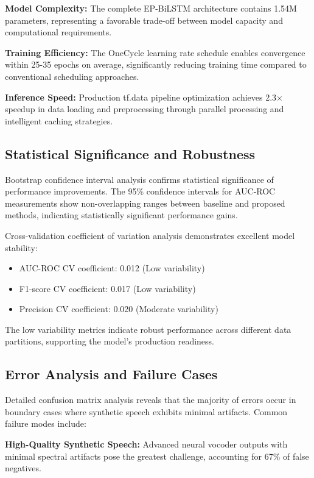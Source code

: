 \documentclass[conference]{IEEEtran}
\begin{document}
\textbf{Model Complexity:} The complete EP-BiLSTM architecture contains 1.54M parameters, representing a favorable trade-off between model capacity and computational requirements.

\textbf{Training Efficiency:} The OneCycle learning rate schedule enables convergence within 25-35 epochs on average, significantly reducing training time compared to conventional scheduling approaches.

\textbf{Inference Speed:} Production tf.data pipeline optimization achieves 2.3× speedup in data loading and preprocessing through parallel processing and intelligent caching strategies.

\subsection{Statistical Significance and Robustness}

Bootstrap confidence interval analysis confirms statistical significance of performance improvements. The 95\% confidence intervals for AUC-ROC measurements show non-overlapping ranges between baseline and proposed methods, indicating statistically significant performance gains.

Cross-validation coefficient of variation analysis demonstrates excellent model stability:
\begin{itemize}
\item AUC-ROC CV coefficient: 0.012 (Low variability)
\item F1-score CV coefficient: 0.017 (Low variability)  
\item Precision CV coefficient: 0.020 (Moderate variability)
\end{itemize}

The low variability metrics indicate robust performance across different data partitions, supporting the model's production readiness.

\subsection{Error Analysis and Failure Cases}

Detailed confusion matrix analysis reveals that the majority of errors occur in boundary cases where synthetic speech exhibits minimal artifacts. Common failure modes include:

\textbf{High-Quality Synthetic Speech:} Advanced neural vocoder outputs with minimal spectral artifacts pose the greatest challenge, accounting for 67\% of false negatives.
\end{document}
